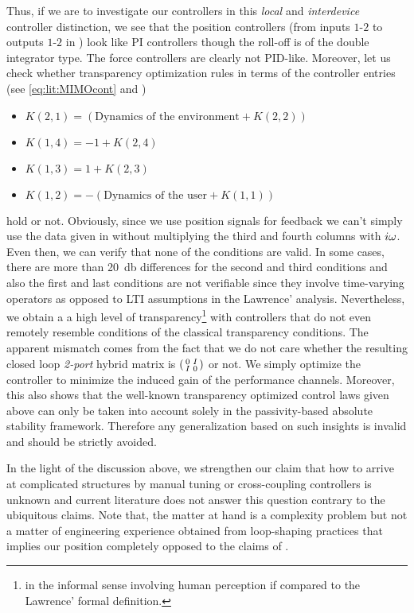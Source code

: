 Thus, if we are to investigate our controllers in this \emph{local} and \emph{interdevice} controller distinction, we see that the position 
controllers (from inputs $1$-$2$ to outputs $1$-$2$ in ) look like PI controllers though the roll-off is of the double
integrator type. The force controllers are clearly not PID-like. Moreover, let us check whether transparency optimization rules in terms of the 
controller entries (see \eqref{eq:lit:MIMOcont} and )
\begin{itemize}
    \item  $K(2,1)= (\text{Dynamics of the environment}+K(2,2))$
	\item  $K(1,4)= -1+K(2,4)$
    \item  $K(1,3)= 1+K(2,3)$
    \item  $K(1,2)= -(\text{Dynamics of the user}+K(1,1))$
\end{itemize}
hold or not. Obviously, since we use position signals for feedback we can't simply use the data given in  without 
multiplying the third and fourth columns with $i\omega$. Even then, we can verify that none of the conditions are valid. In some cases, there are 
more than \SI{20}{\decibel} differences for the second and third conditions and also the first and last conditions are not verifiable since 
they involve time-varying operators as opposed to LTI assumptions in the Lawrence' analysis. Nevertheless, we obtain a a high level of 
transparency\footnote{in the informal sense involving human perception if compared to the Lawrence' formal definition.} with controllers 
that do not even remotely resemble conditions of the classical transparency conditions. The apparent mismatch comes from the fact that we 
do not care whether the resulting closed loop \emph{2-port} hybrid matrix is $\begin{psmallmatrix}0&I\\I&0\end{psmallmatrix}$ or not. We 
simply optimize the controller to minimize the induced gain of the performance channels. Moreover, this also shows that the well-known 
transparency optimized control laws given above can only be taken into account solely in the passivity-based absolute stability framework. 
Therefore any generalization based on such insights is invalid and should be strictly avoided.


In the light of the discussion above, we strengthen our claim that how to arrive at complicated structures by manual tuning or cross-coupling 
controllers is unknown and current literature does not answer this question contrary to the ubiquitous claims. Note that, the matter at hand 
is a complexity problem but not a matter of engineering experience obtained from loop-shaping practices that implies our position completely 
opposed to the claims of \cite{danielmcaree}. 

